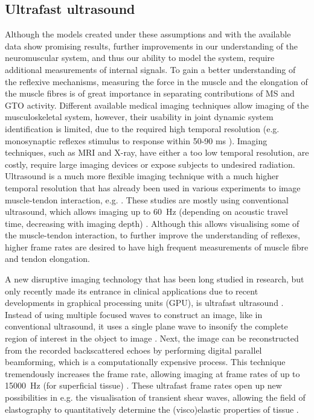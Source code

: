 \subsection*{Ultrafast ultrasound}
Although the models created under these assumptions and with the available data show promising results, further improvements in our understanding of the neuromuscular system, and thus our ability to model the system, require additional measurements of internal signals. To gain a better understanding of the reflexive mechanisms, measuring the force in the muscle and the elongation of the muscle fibres is of great importance in separating contributions of MS and GTO activity. Different available medical imaging techniques allow imaging of the musculoskeletal system, however, their usability in joint dynamic system identification is limited, due to the required high temporal resolution (e.g. monosynaptic reflexes stimulus to response within 50-90 \si{\milli\second} \cite{latash_6_2016}). Imaging techniques, such as MRI and X-ray, have either a too low temporal resolution, are costly, require large imaging devices or expose subjects to undesired radiation. Ultrasound is a much more flexible imaging technique with a much higher temporal resolution that has already been used in various experiments to image muscle-tendon interaction, e.g. \cite{klint_afferent_2009, cronin_automatic_2011}. These studies are mostly using conventional ultrasound, which allows imaging up to \SI{60}{\hertz} (depending on acoustic travel time, decreasing with imaging depth) \cite{minin_ultrafast_2011}. Although this allows visualising some of the muscle-tendon interaction, to further improve the understanding of reflexes, higher frame rates are desired to have high frequent measurements of muscle fibre and tendon elongation. 

A new disruptive imaging technology that has been long studied in research, but only recently made its entrance in clinical applications due to recent developments in graphical processing units (GPU), is ultrafast ultrasound \cite{tanter_ultrafast_2014}. Instead of using multiple focused waves to construct an image, like in conventional ultrasound, it uses a single plane wave to insonify the complete region of interest in the object to image \cite{tanter_ultrafast_2014}. Next, the image can be reconstructed from the recorded backscattered echoes by performing digital parallel beamforming, which is a computationally expensive process. This technique tremendously increases the frame rate, allowing imaging at frame rates of up to \SI{15000}{\hertz} (for superficial tissue) \cite{minin_ultrafast_2011}. These ultrafast frame rates open up new possibilities in e.g. the visualisation of transient shear waves, allowing the field of elastography to quantitatively determine the (visco)elastic properties of tissue \cite{gennisson_ultrasound_2013}. 

